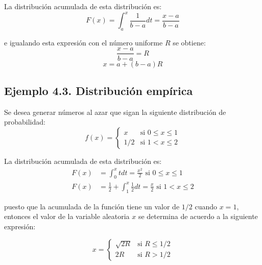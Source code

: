 \documentclass{article}
\begin{document}
La distribución acumulada de esta distribución es:
\begin{equation*}
F(x) = \int_{a}^{x} \frac{1}{b-a} dt = \frac{x-a}{b-a}
\end{equation*}

e igualando esta expresión con el número uniforme $R$ se obtiene:
\begin{equation*}
\frac{x-a}{b-a} = R
\end{equation*}
\begin{equation}
x = a + (b-a)R \tag{4.5}
\end{equation}

\subsection*{Ejemplo 4.3. Distribución empírica}

Se desea generar números al azar que sigan la siguiente distribución de probabilidad:
\begin{equation}
f(x) = \begin{cases}
x & \text{si } 0 \leq x \leq 1 \\
1/2 & \text{si } 1 < x \leq 2
\end{cases} \tag{4.6}
\end{equation}

La distribución acumulada de esta distribución es:
\begin{align*}
F(x) &= \int_{0}^{x} t dt = \frac{x^2}{2} \text{ si } 0 \leq x \leq 1 \\
F(x) &= \frac{1}{2} + \int_{1}^{x} \frac{1}{2} dt = \frac{x}{2} \text{ si } 1 < x \leq 2
\end{align*}

puesto que la acumulada de la función tiene un valor de $1/2$ cuando $x=1$, entonces el valor de la variable aleatoria $x$ se determina de acuerdo a la siguiente expresión:

\begin{equation}
x = \begin{cases}
\sqrt{2R} & \text{si } R \leq 1/2 \\
2R & \text{si } R > 1/2
\end{cases} \tag{4.7}
\end{equation}
\end{document}
